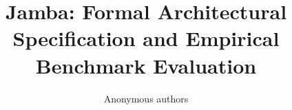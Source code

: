 \title{\textbf{Jamba: Formal Architectural Specification and Empirical Benchmark Evaluation}}

\author{Anonymous authors}

